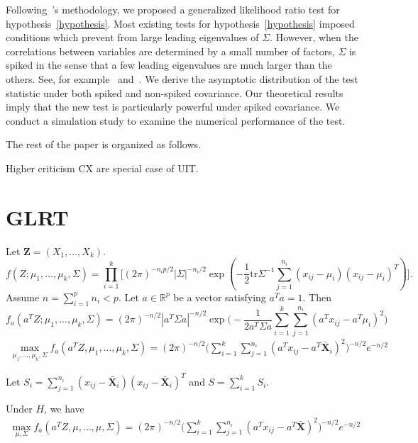 \documentclass[review]{elsarticle}
\theoremstyle{plain}
\theoremstyle{definition}
\theoremstyle{remark}
\begin{document}
    Following~\cite{Zhao2016A}'s methodology, we proposed a generalized likelihood ratio test for hypothesis~\eqref{hypothesis}.
    Most existing tests for hypothesis~\eqref{hypothesis} imposed conditions which prevent from large leading eigenvalues of $\Sigma$.
    However, when the correlations between variables are determined by a small number of factors, $\Sigma$ is spiked in the sense that a few leading eigenvalues are much larger than the others. See, for example~\cite{Cai2012Sparse} and~\cite{Shen2013Consistency}.
    We derive the asymptotic distribution of the test statistic under both spiked and non-spiked covariance.
    Our theoretical results imply that the new test is particularly powerful under spiked covariance.
    We conduct a simulation study to examine the numerical performance of the test.

    The rest of the paper is organized  as follows.

    Higher criticism CX are special case of UIT.
    
\section{GLRT}
Let $\mathbf{Z}=(X_1,\ldots,X_k)$.
$$
f(Z;\mu_1,\ldots,\mu_k,\Sigma)=\prod_{i=1}^k\Big[
    (2\pi)^{-n_i p/2}|\Sigma|^{-n_i/2}\exp(-\frac{1}{2}\mathrm{tr}\Sigma^{-1}\sum_{j=1}^{n_i}(x_{ij}-\mu_i)(x_{ij}-\mu_i)^T)
    \Big].
$$
Assume $n=\sum_{i=1}^p n_i<p$. Let $a\in \mathbb{R}^p$ be a vector satisfying $a^T a=1$. Then
$$
f_a(a^T Z;\mu_1,\ldots,\mu_k,\Sigma)=
    (2\pi)^{-n/2}|a^T \Sigma a|^{-n/2}\exp\Big(-\frac{1}{2 a^T \Sigma a}\sum_{i=1}^k\sum_{j=1}^{n_i}(a^Tx_{ij}-a^T\mu_i)^2\Big)
$$
\begin{equation}
    \begin{aligned}
        \max_{\mu_1,\ldots,\mu_k,\Sigma}f_a(a^T Z,\mu_1,\ldots,\mu_k,\Sigma)
        =
        (2\pi)^{-n/2}\big(\sum_{i=1}^k\sum_{j=1}^{n_i}(a^Tx_{ij}-a^T\bar{\mathbf{X}}_i)^2\big)^{-n/2}e^{-{n}/{2}}
    \end{aligned}
\end{equation}

Let $S_i=\sum_{j=1}^{n_i}(x_{ij}-\bar{\mathbf{X}}_i)(x_{ij}-\bar{\mathbf{X}}_i)^T$ and $S=\sum_{i=1}^k S_i$.


Under $H$, we have
\begin{equation}
    \begin{aligned}
        \max_{\mu,\Sigma}f_a(a^T Z,\mu,\ldots,\mu,\Sigma)
        =
        (2\pi)^{-n/2}\big(\sum_{i=1}^k\sum_{j=1}^{n_i}(a^Tx_{ij}-a^T\bar{\mathbf{X}})^2\big)^{-n/2}e^{-{n}/{2}}
    \end{aligned}
\end{equation}
\end{document}
